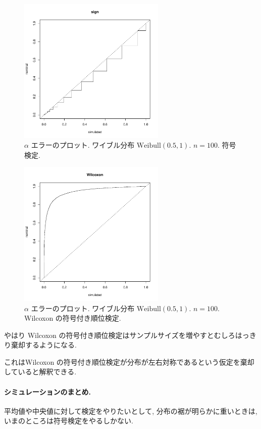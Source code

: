 \documentclass[12pt]{jsarticle}
\begin{document}
 \begin{figure}[htbp]
 \begin{center}
  \includegraphics[width=70mm]{img/pv_weibull_05_1_n100_sign.pdf}
 \end{center}
      \caption{$\alpha$ エラーのプロット. ワイブル分布 $\mathrm{Weibull}(0.5,1)$. $n=100$. 符号検定.}
     \end{figure}  

 \begin{figure}[htbp]
 \begin{center}
  \includegraphics[width=70mm]{img/pv_weibull_05_1_n100_wilco.pdf}
 \end{center}
       \caption{$\alpha$ エラーのプロット. ワイブル分布 $\mathrm{Weibull}(0.5,1)$. $n=100$. Wilcoxon の符号付き順位検定.}
  \label{fig_pv_weibull_05_1_100_wilco}
\end{figure}

やはり Wilcoxon の符号付き順位検定はサンプルサイズを増やすとむしろはっきり棄却するようになる.

これはWilcoxon の符号付き順位検定が分布が左右対称であるという仮定を棄却していると解釈できる.

\paragraph{シミュレーションのまとめ.} 平均値や中央値に対して検定をやりたいとして, 分布の裾が明らかに重いときは, いまのところは符号検定をやるしかない. 
\end{document}
